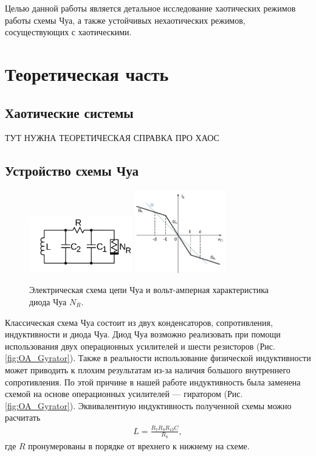 \documentclass[12pt]{article}
\begin{document}
Целью данной работы является детальное исследование хаотических режимов работы схемы Чуа,
а также устойчивых нехаотических режимов, сосуществующих с хаотическими.

\section*{Теоретическая часть}
\subsection*{Хаотические системы}
ТУТ НУЖНА ТЕОРЕТИЧЕСКАЯ СПРАВКА ПРО ХАОС

\subsection*{Устройство схемы Чуа}
\begin{figure}[H]
	\centering
	\includegraphics[width=0.4\textwidth]{Base_chua_curcuit.png}
	\hfil
	\includegraphics[width=0.35\textwidth]{chua_VAC.png}
	\caption{Электрическая схема цепи Чуа и вольт-амперная характеристика диода Чуа $N_R$.}
	\label{fig:base_curcuit}
\end{figure}
Классическая схема Чуа состоит из двух конденсаторов, сопротивления, индуктивности и диода Чуа.
Диод Чуа возможно реализовать при помощи использования двух операционных усилителей и шести резисторов (Рис. \ref{fig:OA_Gyrator}).
Также в реальности использование физической индуктивности может приводить к плохим результатам из-за наличия большого внутреннего
сопротивления. По этой причине в нашей работе индуктивность была заменена схемой на основе операционных усилителей --- гиратором (Рис. \ref{fig:OA_Gyrator}).
Эквивалентную индуктивность полученной схемы можно расчитать
\begin{eqnarray}
	L = \frac{R_7 R_9 R_{10} C}{R_8},
	\label{eq:gyrator}
\end{eqnarray}
где $R$ пронумерованы в порядке от врехнего к нижнему на схеме.
\end{document}
